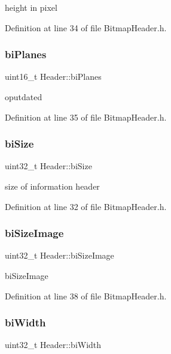 height in pixel 

Definition at line 34 of file Bitmap\+Header.\+h.

\mbox{\label{structHeader_ad6438b98bf17f799cc9cd1285da92426}} 
\subsubsection{\texorpdfstring{biPlanes}{biPlanes}}
{\footnotesize\ttfamily uint16\+\_\+t Header\+::bi\+Planes}

oputdated 

Definition at line 35 of file Bitmap\+Header.\+h.

\mbox{\label{structHeader_ad0177b2629281c20f349c0fa05d6871c}} 
\subsubsection{\texorpdfstring{biSize}{biSize}}
{\footnotesize\ttfamily uint32\+\_\+t Header\+::bi\+Size}

size of information header 

Definition at line 32 of file Bitmap\+Header.\+h.

\mbox{\label{structHeader_a714d9d2941682d1b7ab0349dd2b7530f}} 
\subsubsection{\texorpdfstring{biSizeImage}{biSizeImage}}
{\footnotesize\ttfamily uint32\+\_\+t Header\+::bi\+Size\+Image}

bi\+Size\+Image 

Definition at line 38 of file Bitmap\+Header.\+h.

\mbox{\label{structHeader_afb7f08c913da5d5a09af9ee77a2a03fb}} 
\subsubsection{\texorpdfstring{biWidth}{biWidth}}
{\footnotesize\ttfamily uint32\+\_\+t Header\+::bi\+Width}


